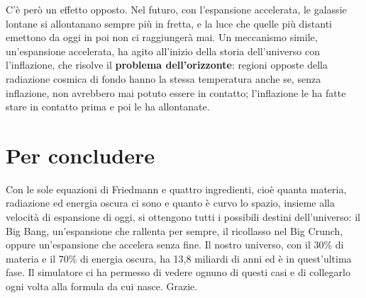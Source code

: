\documentclass[12pt,a4paper]{article}
\begin{document}
C'è però un effetto opposto. Nel futuro, con l'espansione accelerata, le galassie lontane si allontanano sempre più in fretta, e la luce che quelle più distanti emettono da oggi in poi non ci raggiungerà mai. Un meccanismo simile, un'espansione accelerata, ha agito all'inizio della storia dell'universo con l'inflazione, che risolve il \textbf{problema dell'orizzonte}: regioni opposte della radiazione cosmica di fondo hanno la stessa temperatura anche se, senza inflazione, non avrebbero mai potuto essere in contatto; l'inflazione le ha fatte stare in contatto prima e poi le ha allontanate.

\section{Per concludere}
Con le sole equazioni di Friedmann e quattro ingredienti, cioè quanta materia, radiazione ed energia oscura ci sono e quanto è curvo lo spazio, insieme alla velocità di espansione di oggi, si ottengono tutti i possibili destini dell'universo: il Big Bang, un'espansione che rallenta per sempre, il ricollasso nel Big Crunch, oppure un'espansione che accelera senza fine. Il nostro universo, con il 30\% di materia e il 70\% di energia oscura, ha 13,8 miliardi di anni ed è in quest'ultima fase. Il simulatore ci ha permesso di vedere ognuno di questi casi e di collegarlo ogni volta alla formula da cui nasce. Grazie.
\end{document}
